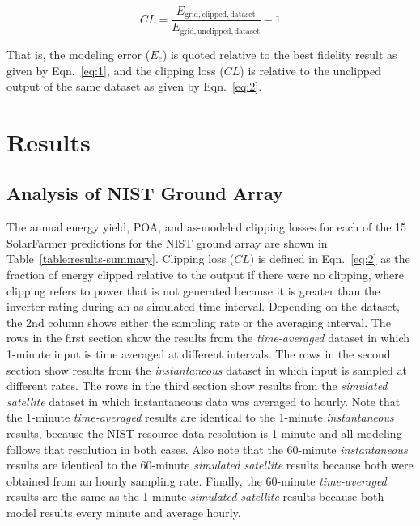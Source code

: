 \documentclass[conference]{IEEEtran}
\begin{document}
\begin{equation} \label{eq:2}
\mathit{CL} = \frac{E_\mathrm{grid,clipped,dataset}}{E_\mathrm{grid,unclipped,dataset}} - 1
\end{equation}

That is, the modeling error ($E_e$) is quoted relative to the best fidelity result as given by Eqn.~\ref{eq:1}, and the clipping loss ($\mathit{CL}$) is relative to the unclipped output of the same dataset as given by Eqn.~\ref{eq:2}.

\section{Results}
\label{section:results}

\subsection{Analysis of NIST Ground Array}
The annual energy yield, POA, and as-modeled clipping losses for each of the 15 SolarFarmer predictions for the NIST ground array are shown in Table~\ref{table:results-summary}. Clipping loss ($\mathit{CL}$) is defined in Eqn.~\ref{eq:2} as the fraction of energy clipped relative to the output if there were no clipping, where clipping refers to power that is not generated because it is greater than the inverter rating during an as-simulated time interval. Depending on the dataset, the 2nd column shows either the sampling rate or the averaging interval. The rows in the first section show the results from the \emph{time-averaged} dataset in which 1-minute input is time averaged at different intervals. The rows in the second section show results from the \emph{instantaneous} dataset in which input is sampled at different rates. The rows in the third section show results from the \emph{simulated satellite} dataset in which instantaneous data was averaged to hourly. Note that the 1-minute \emph{time-averaged} results are identical to the 1-minute \emph{instantaneous} results, because the NIST resource data resolution is 1-minute and all modeling follows that resolution in both cases. Also note that the 60-minute \emph{instantaneous} results are identical to the 60-minute \emph{simulated satellite} results because both were obtained from an hourly sampling rate. Finally, the 60-minute \emph{time-averaged} results are the same as the 1-minute \emph{simulated satellite} results because both model results every minute and average hourly.
\end{document}

